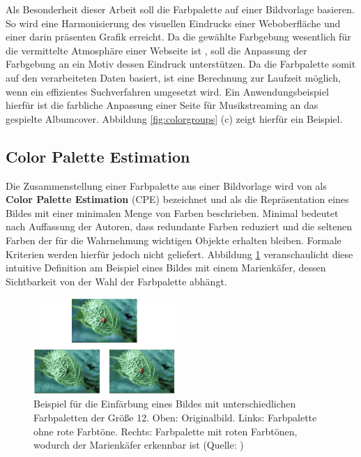 \documentclass[11pt,a4paper,bibliography=totoc,twocolumn]{scrartcl}
\begin{document}
Als Besonderheit dieser Arbeit soll die Farbpalette auf einer Bildvorlage basieren. So wird eine Harmonisierung des visuellen Eindrucks einer Weboberfläche und einer darin präsenten Grafik erreicht. Da die gewählte Farbgebung wesentlich für die vermittelte Atmosphäre einer Webseite ist \citep{webdesign}, soll die Anpassung der Farbgebung an ein Motiv dessen Eindruck unterstützen. Da die Farbpalette somit auf den verarbeiteten Daten basiert, ist eine Berechnung zur Laufzeit möglich, wenn ein effizientes Suchverfahren umgesetzt wird. Ein Anwendungsbeispiel hierfür ist die farbliche Anpassung einer Seite für Musikstreaming an das gespielte Albumcover. Abbildung \ref{fig:colorgroups} (c) zeigt hierfür ein Beispiel.

\subsection{Color Palette Estimation}

Die Zusammenstellung einer Farbpalette aus einer Bildvorlage wird von \citet{acopa} als \textbf{Color Palette Estimation} (CPE) bezeichnet und als die Repräsentation eines Bildes mit einer minimalen Menge von Farben beschrieben. \glqq{}Minimal\grqq{} bedeutet nach Auffassung der Autoren, dass redundante Farben reduziert und die seltenen Farben der für die Wahrnehmung wichtigen Objekte erhalten bleiben. Formale Kriterien werden hierfür jedoch nicht geliefert. Abbildung \ref{fig:ladybug} veranschaulicht diese intuitive Definition am Beispiel eines Bildes mit einem Marienkäfer, dessen Sichtbarkeit von der Wahl der Farbpalette abhängt.

\begin{figure}[h]
\centering
\includegraphics[width=0.48\textwidth]{img/ladybug.png}
\caption{Beispiel für die Einfärbung eines Bildes mit unterschiedlichen Farbpaletten der Größe 12. Oben: Originalbild. Links: Farbpalette ohne rote Farbtöne. Rechts: Farbpalette mit roten Farbtönen, wodurch der Marienkäfer erkennbar ist (Quelle: \citep{acopa})}
\label{fig:ladybug}
\end{figure}
\end{document}

